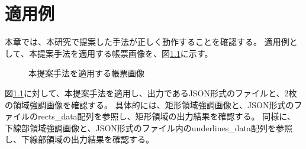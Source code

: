 \chapter{適用例}\label{cha:Indication}
本章では、本研究で提案した手法が正しく動作することを確認する。
適用例として、本提案手法を適用する帳票画像を、図\ref{fig:indication_original}に示す。

\begin{figure}[t]
    \begin{center}
        \caption{本提案手法を適用する帳票画像}
        \label{fig:indication_original}
    \end{center}
\end{figure}

図\ref{fig:indication_original}に対して、本提案手法を適用し、出力であるJSON形式のファイルと、2枚の領域強調画像を確認する。
具体的には、矩形領域強調画像と、JSON形式のファイルのrects\_data配列を参照し、矩形領域の出力結果を確認する。
同様に、下線部領域強調画像と、JSON形式のファイル内のunderlines\_data配列を参照し、下線部領域の出力結果を確認する。

